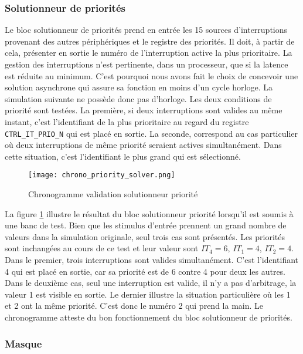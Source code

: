 \subsubsection{Solutionneur de priorités}
Le bloc solutionneur de priorités prend en entrée les 15 sources d'interruptions provenant des autres périphériques et le registre des priorités.
Il doit, à partir de cela, présenter en sortie le numéro de l'interruption active la plus prioritaire.
La gestion des interruptions n'est pertinente, dans un processeur, que si la latence est réduite au minimum.
C'est pourquoi nous avons fait le choix de concevoir une solution asynchrone qui assure sa fonction en moins d'un cycle horloge.
La simulation suivante ne possède donc pas d'horloge.
Les deux conditions de priorité sont testées.
La première, si deux interruptions sont valides au même instant, c'est l'identifiant de la plus prioritaire au regard du registre \texttt{CTRL\_IT\_PRIO\_N} qui est placé en sortie.
La seconde, correspond au cas particulier où deux interruptions de même priorité seraient actives simultanément.
Dans cette situation, c'est l'identifiant le plus grand qui est sélectionné.
\begin{figure}[H]
    \centering
    \texttt{[image: chrono\_priority\_solver.png]}
    \caption{Chronogramme validation solutionneur priorité}
    \label{fig:chrono_prio_solv}
\end{figure}
La figure \ref{fig:chrono_prio_solv} illustre le résultat du bloc solutionneur priorité lorsqu'il est soumis à une banc de test.
Bien que les stimulus d'entrée prennent un grand nombre de valeurs dans la simulation originale, seul trois cas sont présentés.
Les priorités sont inchangées au cours de ce test et leur valeur sont $IT_4=6$, $IT_1=4$, $IT_2=4$.
Dans le premier, trois interruptions sont valides simultanément.
C'est l'identifiant 4 qui est placé en sortie, car sa priorité est de 6 contre 4 pour deux les autres.
Dans le deuxième cas, seul une interruption est valide, il n'y a pas d'arbitrage, la valeur 1 est visible en sortie.
Le dernier illustre la situation particulière où les 1 et 2 ont la même priorité.
C'est donc le numéro 2 qui prend la main.
Le chronogramme atteste du bon fonctionnement du bloc solutionneur de priorités.


\subsubsection{Masque}

